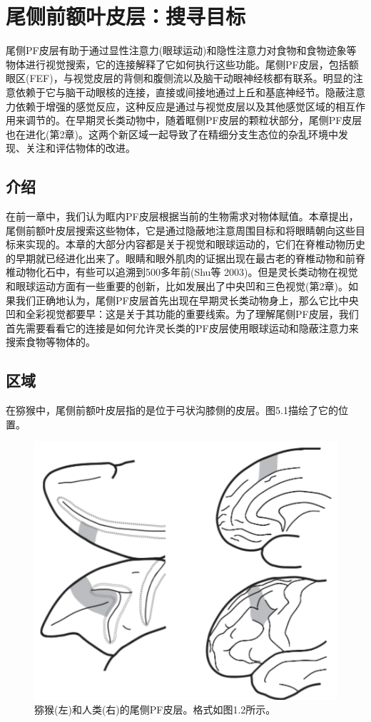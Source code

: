 \chapter{尾侧前额叶皮层：搜寻目标}
尾侧PF皮层有助于通过显性注意力(眼球运动)和隐性注意力对食物和食物迹象等物体进行视觉搜索，它的连接解释了它如何执行这些功能。尾侧PF皮层，包括额眼区(FEF)，与视觉皮层的背侧和腹侧流以及脑干动眼神经核都有联系。明显的注意依赖于它与脑干动眼核的连接，直接或间接地通过上丘和基底神经节。隐蔽注意力依赖于增强的感觉反应，这种反应是通过与视觉皮层以及其他感觉区域的相互作用来调节的。在早期灵长类动物中，随着眶侧PF皮层的颗粒状部分，尾侧PF皮层也在进化(第2章)。这两个新区域一起导致了在精细分支生态位的杂乱环境中发现、关注和评估物体的改进。

\section{介绍}
在前一章中，我们认为眶内PF皮层根据当前的生物需求对物体赋值。本章提出，尾侧前额叶皮层搜索这些物体，它是通过隐蔽地注意周围目标和将眼睛朝向这些目标来实现的。本章的大部分内容都是关于视觉和眼球运动的，它们在脊椎动物历史的早期就已经进化出来了。眼睛和眼外肌肉的证据出现在最古老的脊椎动物和前脊椎动物化石中，有些可以追溯到500多年前(Shu等 2003)。但是灵长类动物在视觉和眼球运动方面有一些重要的创新，比如发展出了中央凹和三色视觉(第2章)。如果我们正确地认为，尾侧PF皮层首先出现在早期灵长类动物身上，那么它比中央凹和全彩视觉都要早：这是关于其功能的重要线索。为了理解尾侧PF皮层，我们首先需要看看它的连接是如何允许灵长类的PF皮层使用眼球运动和隐蔽注意力来搜索食物等物体的。
\section{区域}
在猕猴中，尾侧前额叶皮层指的是位于弓状沟膝侧的皮层。图5.1描绘了它的位置。
\begin{figure}
	\centering
	\includegraphics[width=0.7\linewidth]{image_pfc/Fig.5.1}
	\caption{猕猴(左)和人类(右)的尾侧PF皮层。格式如图1.2所示。}
	\label{fig:fig}
\end{figure}


